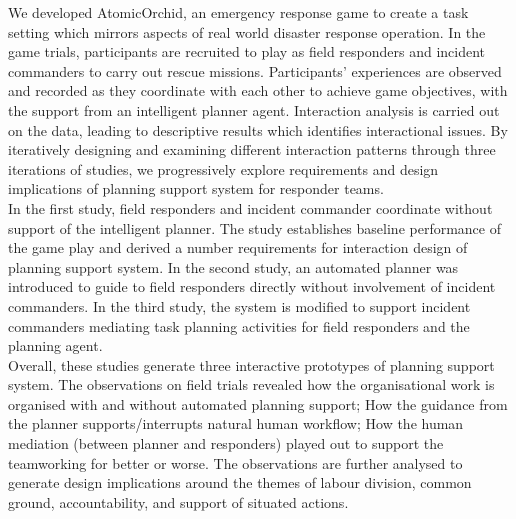 We developed AtomicOrchid, an emergency response game to create a task setting which mirrors aspects of real world disaster response operation. In the game trials, participants are recruited to play as field responders and incident commanders to carry out rescue missions. Participants' experiences are observed and recorded as they coordinate with each other to achieve game objectives, with the support from an intelligent planner agent. Interaction analysis is carried out on the data, leading to descriptive results which identifies interactional issues. By iteratively designing and examining different interaction patterns through three iterations of studies, we progressively explore requirements and design implications of planning support system for responder teams.\\

In the first study, field responders and incident commander coordinate without support of the intelligent planner. The study establishes baseline performance of the game play and derived a number requirements for interaction design of planning support system. In the second study, an automated planner was introduced to guide to field responders directly without involvement of incident commanders. In the third study, the system is modified to support incident commanders mediating task planning activities for field responders and the planning agent. \\

Overall, these studies generate three interactive prototypes of planning support system. The observations on field trials revealed how the organisational work is organised with and without automated planning support; How the guidance from the planner supports/interrupts natural human workflow; How the human mediation (between planner and responders) played out to support the teamworking for better or worse. The observations are further analysed to generate design implications around the themes of labour division, common ground, accountability, and support of situated actions.\\  


\endgroup			

\vfill